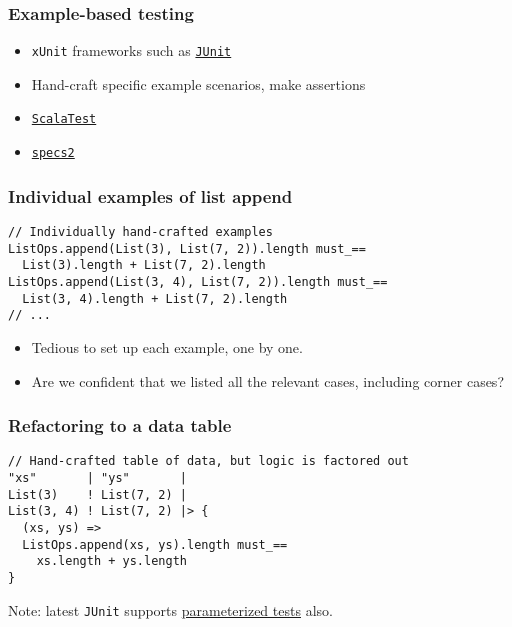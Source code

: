 \documentclass{beamer}
\begin{document}
\begin{frame}
  \frametitle{Example-based testing}

  \begin{itemize}
    \item \texttt{xUnit} frameworks such as \href{http://junit.org/}{\texttt{JUnit}}
    \item Hand-craft specific example scenarios, make assertions
  \end{itemize}


  \begin{itemize}
    \item<2-> \href{http://scalatest.org/}{\texttt{ScalaTest}}
    \item<3-> \href{http://etorreborre.github.io/specs2/}{\texttt{specs2}}
  \end{itemize}

\end{frame}

\begin{frame}[fragile]
  \frametitle{Individual examples of list append}

  \begin{verbatim}
// Individually hand-crafted examples
ListOps.append(List(3), List(7, 2)).length must_==
  List(3).length + List(7, 2).length
ListOps.append(List(3, 4), List(7, 2)).length must_==
  List(3, 4).length + List(7, 2).length
// ...
  \end{verbatim}

  \begin{itemize}
    \item Tedious to set up each example, one by one.
    \item Are we confident that we listed all the relevant cases, including corner cases?
  \end{itemize}
\end{frame}

\begin{frame}[fragile]
  \frametitle{Refactoring to a data table}

  \begin{verbatim}
// Hand-crafted table of data, but logic is factored out
"xs"       | "ys"       |
List(3)    ! List(7, 2) |
List(3, 4) ! List(7, 2) |> {
  (xs, ys) =>
  ListOps.append(xs, ys).length must_==
    xs.length + ys.length
}
  \end{verbatim}

  Note: latest \texttt{JUnit} supports \href{https://github.com/junit-team/junit/wiki/Parameterized-tests}{parameterized tests} also.
\end{frame}
\end{document}
